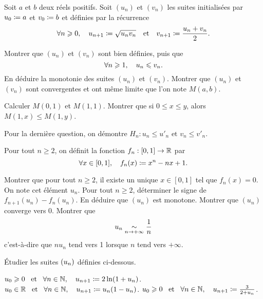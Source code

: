 \documentclass{magnolia}
\begin{document}
Soit $a$ et $b$ deux réels positifs. Soit $(u_n)$ et $(v_n)$ les suites initialisées par $u_0\coloneqq a$ et $v_0\coloneqq b$ et définies par la récurrence
$$\forall n \geqslant 0 ,\quad u_{n+1}\coloneqq\sqrt{u_n v_n} \quad \text{et} \quad v_{n+1}\coloneqq\frac{u_n + v_n}{2}.$$
\begin{questions}
\question
  \begin{questions}
  \question Montrer que $(u_n)$ et $(v_n)$ sont bien définies, puis que
    $$\forall n \geqslant 1 ,\quad u_n \leqslant v_n.$$
  \question En déduire la monotonie des suites $(u_n)$ et $(v_n)$.
  \question Montrer que $(u_n)$ et $(v_n)$ sont convergentes et ont même limite que l'on
    note $M(a,b)$.
  \end{questions}
\question
  \begin{questions}
  \question Calculer $M(0,1)$ et $M(1,1)$.
  \question Montrer que si $0\leq x\leq y$, alors $M(1,x)\leq M(1,y)$.
  \end{questions}
\end{questions}
\begin{sol}
Pour la dernière question, on démontre $H_n : u_n\leq u'_n \text{ et } v_n\leq v'_n$.
\end{sol}

Pour tout $n\geq 2$, on définit la fonction $f_n:[0,1]\to\mathbb{R}$ par
\[\forall x\in [0,1],\quad f_n(x)\coloneqq x^n - nx + 1.\]
\begin{questions}
\question Montrer que pour tout $n\geq 2$, il existe un unique $x\in [0,1]$
  tel que $f_n(x)=0$. On note cet élément $u_n$.
\question Pour tout $n\geq 2$, déterminer le signe de $f_{n+1}(u_n) - f_n(u_n)$.
  En déduire que $(u_n)$ est monotone.
\question Montrer que $(u_n)$ converge vers 0.
\question Montrer que
  \[u_n\underset{n\rightarrow +\infty}{\sim}\frac{1}{n}\]
  c'est-à-dire que $n u_n$ tend vers 1 lorsque $n$ tend vers $+\infty$.
\end{questions}



Étudier les suites $\left(u_n\right)$ définies ci-dessous.
\begin{questions}
\question $u_0\geqslant 0 \quad\!\text{et}\quad\! \forall n\in\mathbb{N} ,\quad u_{n+1}\coloneqq 2\ln(1+u_n)$.
\question $u_0\in\mathbb{R} \quad\!\text{et}\quad\! \forall n\in\mathbb{N} ,\quad u_{n+1}\coloneqq u_n(1-u_n)$.
\question $u_0\geqslant 0 \quad\!\text{et}\quad\! \forall n\in\mathbb{N} ,\quad u_{n+1}\coloneqq \frac{3}{2+u_n}$.
\end{questions}
\end{document}
